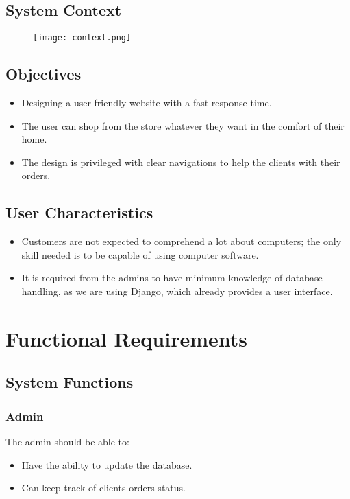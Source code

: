 \documentclass[12pt]{article}
\begin{document}
\subsection{System Context}
\begin{figure}[h]
\texttt{[image: context.png]}
\end{figure}
\subsection{Objectives}
\begin{itemize}
 \item Designing a user-friendly website with a fast response time.
 \item The user can shop from the store whatever they want in the comfort of their home.
 \item The design is privileged with clear navigations to help the clients with their orders.
\end{itemize}

\subsection{ User Characteristics}
\begin{itemize}
\item Customers are not expected to comprehend a lot about computers; the only skill needed is to be capable of using computer software.
\item It is required from the admins to have minimum knowledge of database handling, as we are using Django, which already provides a user interface. 
\end{itemize}

\pagebreak 
\section{Functional Requirements}
\subsection{System Functions}\label{System Functions}
\subsubsection{Admin}
The admin should be able to:
\begin{itemize}
\item Have the ability to update the database.
\item Can keep track of clients orders status.
\end{itemize}
\end{document}
